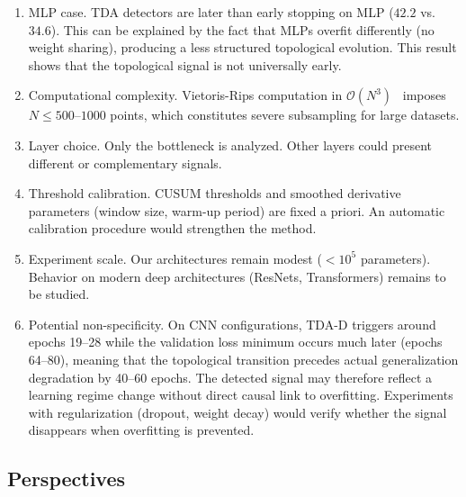 \documentclass[11pt,a4paper]{article}
\begin{document}
\begin{enumerate}
  \item MLP case. TDA detectors are later than early stopping on
  MLP ($42.2$ vs.\ $34.6$). This can be explained by the fact that MLPs
  overfit differently (no weight sharing), producing a less structured
  topological evolution. This result shows that the topological signal is
  not universally early.

  \item Computational complexity. Vietoris-Rips computation in
  $\mathcal{O}(N^3)$~\cite{Edelsbrunner2009ComputationalTA} imposes
  $N \leqslant 500$--$1000$ points, which constitutes severe subsampling
  for large datasets.

  \item Layer choice. Only the bottleneck is analyzed. Other layers
  could present different or complementary signals.

  \item Threshold calibration. CUSUM thresholds and smoothed
  derivative parameters (window size, warm-up period) are fixed a priori.
  An automatic calibration procedure would strengthen the method.

  \item Experiment scale. Our architectures remain modest
  ($< 10^5$ parameters). Behavior on modern deep architectures (ResNets,
  Transformers) remains to be studied.

  \item Potential non-specificity. On CNN configurations, TDA-D
  triggers around epochs 19--28 while the validation loss minimum
  occurs much later (epochs 64--80), meaning that the topological
  transition precedes actual generalization degradation by 40--60 epochs.
  The detected signal may therefore reflect a learning regime change
  without direct causal link to overfitting. Experiments with
  regularization (dropout, weight decay) would verify whether the signal
  disappears when overfitting is prevented.
\end{enumerate}

\subsection{Perspectives}
\label{subsec:perspectives}
\end{document}
